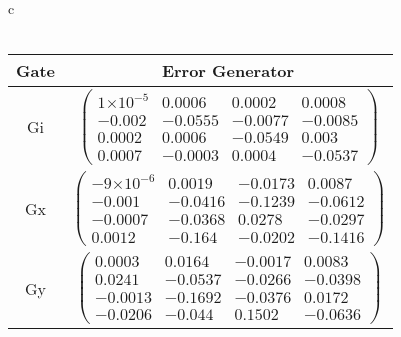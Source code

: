 \documentclass{beamer}
\providecommand{\e}[1]{\ensuremath{\times 10^{#1}}}
\begin{document}
\begin{frame}
\begin{table}[h]
\begin{center}
{\begin{tabular}{c}
\\
\vspace{2em}
\\
\begin{tabular}[l]{|c|c|}
\hline
Gate & Error Generator \\ \hline
Gi & $ \left(\!\!\begin{array}{cccc}
1\e{-5} & 0.0006 & 0.0002 & 0.0008 \\ 
-0.002 & -0.0555 & -0.0077 & -0.0085 \\ 
0.0002 & 0.0006 & -0.0549 & 0.003 \\ 
0.0007 & -0.0003 & 0.0004 & -0.0537
 \end{array}\!\!\right) $
 \\ \hline
Gx & $ \left(\!\!\begin{array}{cccc}
-9\e{-6} & 0.0019 & -0.0173 & 0.0087 \\ 
-0.001 & -0.0416 & -0.1239 & -0.0612 \\ 
-0.0007 & -0.0368 & 0.0278 & -0.0297 \\ 
0.0012 & -0.164 & -0.0202 & -0.1416
 \end{array}\!\!\right) $
 \\ \hline
Gy & $ \left(\!\!\begin{array}{cccc}
0.0003 & 0.0164 & -0.0017 & 0.0083 \\ 
0.0241 & -0.0537 & -0.0266 & -0.0398 \\ 
-0.0013 & -0.1692 & -0.0376 & 0.0172 \\ 
-0.0206 & -0.044 & 0.1502 & -0.0636
 \end{array}\!\!\right) $
 \\ \hline
\end{tabular}

\end{tabular}
}
\end{center}
\end{table}

\end{frame}
\end{document}
